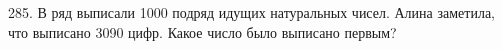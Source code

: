 285. В ряд выписали 1000 подряд идущих натуральных чисел. Алина заметила, что выписано 3090 цифр. Какое число было выписано первым?\\
